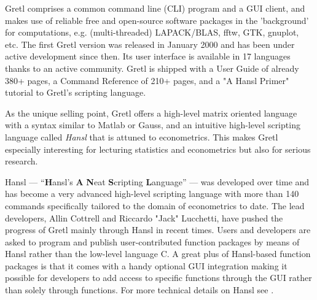 \documentclass[11pt]{article}
\begin{document}
Gretl comprises %
a common command line (CLI) program and a GUI client, and makes use of reliable free and open-source software packages in the 'background' for computations, e.g. (multi-threaded) LAPACK/BLAS, fftw, GTK, gnuplot, etc. The first Gretl version was released in January 2000 and has been under active development %
since then. Its user interface is available in 17 languages thanks to an active community. Gretl is shipped with a User Guide of already 380+ pages, a Command Reference of 210+ pages, and a "A Hansl Primer" tutorial to Gretl's scripting language.%

As the unique selling point, Gretl offers a high-level matrix oriented language with a syntax similar to Matlab or Gauss, and an intuitive high-level scripting language called \textit{Hansl} that is attuned to econometrics. This makes Gretl especially interesting for lecturing statistics and econometrics but also for serious research.

Hansl --- “\textbf{H}ansl’s \textbf{A} \textbf{N}eat \textbf{S}cripting \textbf{L}anguage” --- was developed over time and has become a very advanced high-level scripting language with more than 140 commands specifically tailored to the domain of econometrics to date. 
The lead developers, Allin Cottrell and Riccardo "Jack" Lucchetti, have pushed the progress of Gretl mainly through Hansl in recent times. Users and developers are asked to program and publish user-contributed function packages by means of Hansl rather than the low-level language C. A great plus of Hansl-based function packages is that it comes with a handy optional GUI integration making it possible for developers to add access to specific functions through the GUI rather than solely through functions. %
For more technical details on Hansl see \citet{Cottrell2017}.
\end{document}
